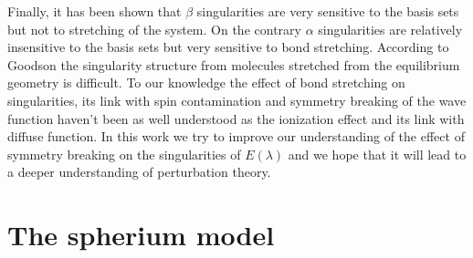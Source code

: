 \documentclass[11pt,a4paper]{article}
\begin{document}
Finally, it has been shown that $\beta$ singularities are very sensitive to the basis sets but not to stretching of the system. On the contrary $\alpha$ singularities are relatively insensitive to the basis sets but very sensitive to bond stretching. According to Goodson the singularity structure from molecules stretched from the equilibrium geometry is difficult. To our knowledge the effect of bond stretching on singularities, its link with spin contamination and symmetry breaking of the wave function haven't been as well understood as the ionization effect and its link with diffuse function. In this work we try to improve our understanding of the effect of symmetry breaking on the singularities of $E(\lambda)$ and we hope that it will lead to a deeper understanding of perturbation theory.

\section{The spherium model}
\end{document}
